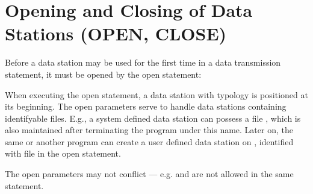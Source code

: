 \section{Opening and Closing of Data Stations (OPEN, CLOSE)}   %
\label{sec_dation_open_close}

Before a data station may be used for the first time in a data
transmission statement, it must be opened by the open statement:

\begin{grammarframe}

\end{grammarframe}

When executing the open statement, a data station with typology is
positioned at its beginning.
The open parameters serve to handle data stations containing
identifyable files. E.g., a system defined data station  can possess
a file , which is also maintained after terminating the program
under this name. Later on, the same or another program can create a user
defined data station  on , identified with file  in the
open statement.


\begin{grammarframe}

\end{grammarframe}


The open parameters may not conflict --- e.g.  and  are not allowed
in the same statement.



